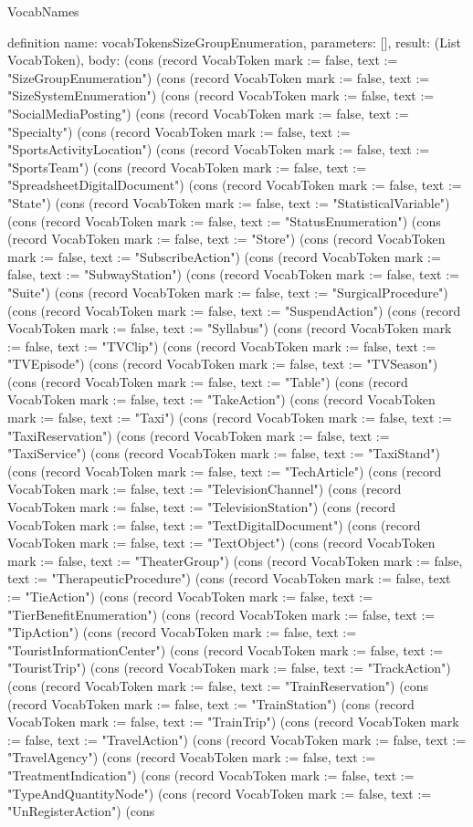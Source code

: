 \begin{lexlean}{VocabNames}
\begin{semanticmodule}
definition{
  name: vocabTokensSizeGroupEnumeration,
  parameters: [],
  result: (List VocabToken),
  body: (cons (record VocabToken {mark := false, text := "SizeGroupEnumeration"}) (cons (record VocabToken {mark := false, text := "SizeSystemEnumeration"}) (cons (record VocabToken {mark := false, text := "SocialMediaPosting"}) (cons (record VocabToken {mark := false, text := "Specialty"}) (cons (record VocabToken {mark := false, text := "SportsActivityLocation"}) (cons (record VocabToken {mark := false, text := "SportsTeam"}) (cons (record VocabToken {mark := false, text := "SpreadsheetDigitalDocument"}) (cons (record VocabToken {mark := false, text := "State"}) (cons (record VocabToken {mark := false, text := "StatisticalVariable"}) (cons (record VocabToken {mark := false, text := "StatusEnumeration"}) (cons (record VocabToken {mark := false, text := "Store"}) (cons (record VocabToken {mark := false, text := "SubscribeAction"}) (cons (record VocabToken {mark := false, text := "SubwayStation"}) (cons (record VocabToken {mark := false, text := "Suite"}) (cons (record VocabToken {mark := false, text := "SurgicalProcedure"}) (cons (record VocabToken {mark := false, text := "SuspendAction"}) (cons (record VocabToken {mark := false, text := "Syllabus"}) (cons (record VocabToken {mark := false, text := "TVClip"}) (cons (record VocabToken {mark := false, text := "TVEpisode"}) (cons (record VocabToken {mark := false, text := "TVSeason"}) (cons (record VocabToken {mark := false, text := "Table"}) (cons (record VocabToken {mark := false, text := "TakeAction"}) (cons (record VocabToken {mark := false, text := "Taxi"}) (cons (record VocabToken {mark := false, text := "TaxiReservation"}) (cons (record VocabToken {mark := false, text := "TaxiService"}) (cons (record VocabToken {mark := false, text := "TaxiStand"}) (cons (record VocabToken {mark := false, text := "TechArticle"}) (cons (record VocabToken {mark := false, text := "TelevisionChannel"}) (cons (record VocabToken {mark := false, text := "TelevisionStation"}) (cons (record VocabToken {mark := false, text := "TextDigitalDocument"}) (cons (record VocabToken {mark := false, text := "TextObject"}) (cons (record VocabToken {mark := false, text := "TheaterGroup"}) (cons (record VocabToken {mark := false, text := "TherapeuticProcedure"}) (cons (record VocabToken {mark := false, text := "TieAction"}) (cons (record VocabToken {mark := false, text := "TierBenefitEnumeration"}) (cons (record VocabToken {mark := false, text := "TipAction"}) (cons (record VocabToken {mark := false, text := "TouristInformationCenter"}) (cons (record VocabToken {mark := false, text := "TouristTrip"}) (cons (record VocabToken {mark := false, text := "TrackAction"}) (cons (record VocabToken {mark := false, text := "TrainReservation"}) (cons (record VocabToken {mark := false, text := "TrainStation"}) (cons (record VocabToken {mark := false, text := "TrainTrip"}) (cons (record VocabToken {mark := false, text := "TravelAction"}) (cons (record VocabToken {mark := false, text := "TravelAgency"}) (cons (record VocabToken {mark := false, text := "TreatmentIndication"}) (cons (record VocabToken {mark := false, text := "TypeAndQuantityNode"}) (cons (record VocabToken {mark := false, text := "UnRegisterAction"}) (cons }
\end{semanticmodule}
\end{lexlean}
